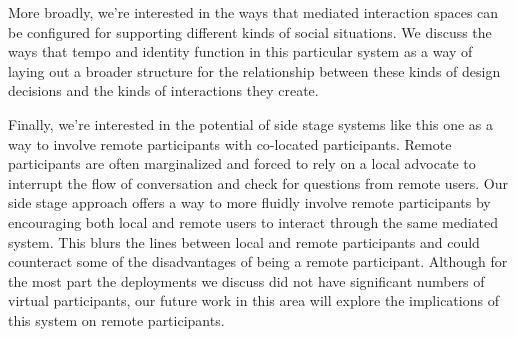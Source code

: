 More broadly, we're interested in the ways that mediated interaction spaces can be configured for supporting different kinds of social situations. We discuss the ways that tempo and identity function in this particular system as a way of laying out a broader structure for the relationship between these kinds of design decisions and the kinds of interactions they create. 

Finally, we're interested in the potential of side stage systems like this one as a way to involve remote participants with co-located participants. Remote participants are often marginalized and forced to rely on a local advocate to interrupt the flow of conversation and check for questions from remote users. Our side stage approach offers a way to more fluidly involve remote participants by encouraging both local and remote users to interact through the same mediated system. This blurs the lines between local and remote participants and could counteract some of the disadvantages of being a remote participant. Although for the most part the deployments we discuss did not have significant numbers of virtual participants, our future work in this area will explore the implications of this system on remote participants.
